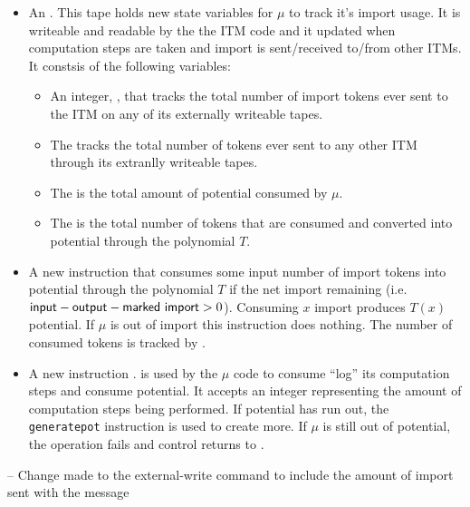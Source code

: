 \begin{itemize}
	\item An . This tape holds new state variables for $\mu$ to track it's import usage. 
	It is writeable and readable by the the ITM code and it updated when computation steps are taken and import is sent/received to/from other ITMs. 
	It constsis of the following variables:
	\begin{itemize}
		\item An integer, , that tracks the total number of import tokens ever sent to the ITM on any of its externally writeable tapes.
		\item The  tracks the total number of tokens ever sent to any other ITM through its extranlly writeable tapes.
		\item The  is the total amount of potential consumed by $\mu$.
		\item The  is the total number of tokens that are consumed and converted into potential through the polynomial $T$.
	\end{itemize}
	\item A new instruction  that consumes some input number of import tokens into potential through the polynomial $T$ if the net import remaining (i.e. ${\mathsf {input}} - {\mathsf {output}} - {\mathsf {marked\ import}} > 0$). Consuming $x$ import produces $T(x)$ potential. If $\mu$ is out of import this instruction does nothing. The number of consumed tokens is tracked by .
	\item A new instruction .  is used by the $\mu$ code to consume ``log'' its computation steps and consume potential. 
	It accepts an integer representing the amount of computation steps being performed. 
	If potential has run out, the \texttt{generatepot} instruction is used to create more. 
	If $\mu$ is still out of potential, the operation fails and control returns to .
\end{itemize}




-- Change made to the external-write command to include the amount of import sent with the message

